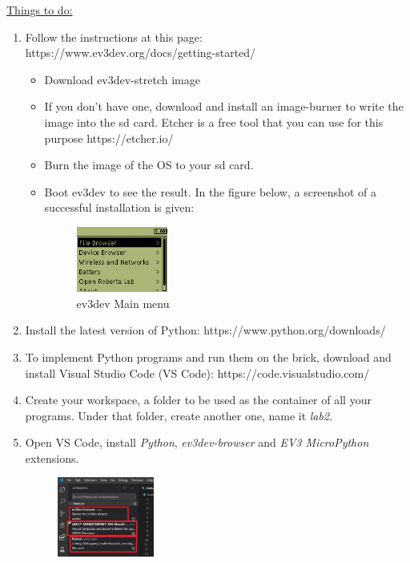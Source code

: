 \documentclass{scrartcl}
\begin{document}
\newpage
\underline{Things to do:}
\begin{enumerate}
    \item Follow the instructions at this page:\\ https://www.ev3dev.org/docs/getting-started/
    \begin{itemize}
        \item Download ev3dev-stretch image
        \item If you don't have one, download and install an image-burner to write the image into the sd card. Etcher is a free tool that you can use for this purpose https://etcher.io/
        \item Burn the image of the OS to your sd card.
        \item Boot ev3dev to see the result. In the figure below, a screenshot of a successful installation is given:
        \begin{figure}[h!]
            \begin{center}
              \includegraphics[width=0.3\textwidth]{main-menu.png}
              \caption{ev3dev Main menu}
            \end{center}
        \end{figure}
    \end{itemize}
    \item Install the latest version of Python: https://www.python.org/downloads/
    \item To implement Python programs and run them on the brick, download and install Visual Studio Code (VS Code): https://code.visualstudio.com/
    \item Create your workspace, a folder to be used as the container of all your programs. Under that folder, create another one, name it \textit{lab2}.
    \item Open VS Code, install \textit{Python}, \textit{ev3dev-browser} and \textit{EV3 MicroPython} extensions.
        \begin{figure}[h!]
            \begin{center}
              \includegraphics[width=0.3\textwidth]{ext.jpg}

\end{center}
\end{figure}
\end{enumerate}
\end{document}
